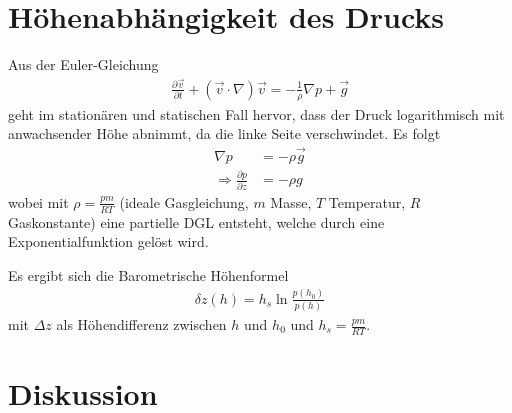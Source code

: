 \documentclass[12pt,a4paper,titlepage,headinclude,bibtotoc]{scrartcl}
\begin{document}
\section{Höhenabhängigkeit des Drucks}
Aus der Euler-Gleichung
\begin{align*}
	\frac{\partial\vec v}{\partial t}+(\vec v\cdot\nabla)\vec v = -\frac{1}{\rho}\nabla p+\vec g
\end{align*}
geht im stationären und statischen Fall hervor, dass der Druck logarithmisch mit anwachsender Höhe abnimmt, da die linke Seite verschwindet.
Es folgt
\begin{align*}
	\nabla p&=-\rho\vec g\\
	\Rightarrow \frac{\partial p}{\partial z}&=-\rho g
\end{align*}
wobei mit $\rho=\frac{pm}{RT}$ (ideale Gasgleichung, $m$ Masse, $T$ Temperatur, $R$ Gaskonstante) eine partielle DGL entsteht, welche durch eine Exponentialfunktion gelöst wird.

Es ergibt sich die Barometrische Höhenformel
\begin{align}
	\delta z(h)=h_s\ln\frac{p(h_0)}{p(h)}
\end{align}
mit $\Delta z$ als Höhendifferenz zwischen $h$ und $h_0$ und $h_s=\frac{pm}{RT}$.




\section{Diskussion}
\label{sec:diskussion}



\end{document}
